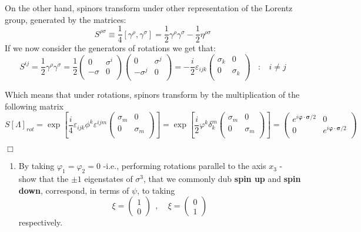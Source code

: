 \documentclass[12pt]{article}
\newcommand{\qedwhite}{\hfill \ensuremath{\Box}}
\begin{document}
On the other hand, spinors transform under other representation of the Lorentz group, generated by the matrices:
\[
    S^{\rho\sigma}\equiv \frac{1}{4}\left[\gamma^\rho,\gamma^\sigma\right] = \frac{1}{2}\gamma^{\rho}\gamma^{\sigma} - \frac{1}{2}\eta^{\rho\sigma}
\]
If we now consider the generators of rotations we get that:
\[
    S^{ij}=\frac{1}{2}\gamma^{\rho}\gamma^{\sigma}=\frac{1}{2}
    \begin{pmatrix}
        0       & \sigma^i \\
        -\sigma & 0        \\
    \end{pmatrix}
    \begin{pmatrix}
        0       & \sigma^j \\
        -\sigma^j & 0        \\
    \end{pmatrix}
    = -\frac{i}{2}\varepsilon_{ijk}
    \begin{pmatrix}
        \sigma_k   &  0        \\
        0          & \sigma_k \\
    \end{pmatrix} ~~~~:~~~~i\neq j
\]

Which means that under rotations, spinors transform by the multiplication of the following matrix
\[
    S[\Lambda]_{rot} = \exp{\left[\frac{i}{4}\varepsilon_{ijk}\phi^{k}\varepsilon^{ijm}\begin{pmatrix}
        \sigma_m   &  0        \\
        0          & \sigma_m \\
\end{pmatrix}\right]} = \exp{\left[\frac{i}{2}\varphi^k\delta_k^m\begin{pmatrix}
        \sigma_m   &  0        \\
        0          & \sigma_m \\
\end{pmatrix}\right]} = \begin{pmatrix}
        e^{i\bm{\varphi}\cdot\bm{\sigma}/2}   &  0        \\
        0          & e^{i\bm{\varphi}\cdot\bm{\sigma}/2}  \\
\end{pmatrix}
\]

\qedwhite

\color{black}

\begin{enumerate}[label=(\alph*), start = 2]
    \item By taking $\varphi_1 = \varphi_2 = 0$ -i.e., performing rotations parallel to the axis $x_3$ - show that the $\pm 1$ eigenstates of $\sigma^3$, that we commonly dub \textbf{spin up} and \textbf{spin down}, correspond, in terms of $\psi$, to taking
        \[
            \xi = \begin{pmatrix}1 \\ 0\end{pmatrix}~~,~~~~~ \xi = \begin{pmatrix}0 \\ 1\end{pmatrix}
        \]
    respectively.
\end{enumerate}
\end{document}
